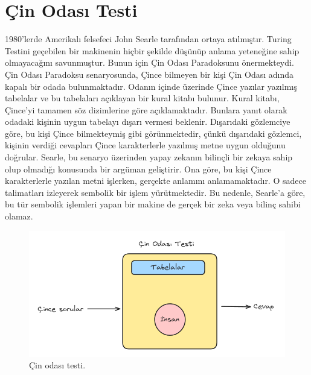 \section{Çin Odası Testi}
1980'lerde Amerikalı felsefeci John Searle tarafından ortaya atılmıştır. Turing Testini geçebilen bir makinenin hiçbir şekilde düşünüp anlama yeteneğine sahip olmayacağını savunmuştur. Bunun için Çin Odası Paradoksunu önermekteydi. Çin Odası Paradoksu senaryosunda, Çince bilmeyen bir kişi Çin Odası adında kapalı bir odada bulunmaktadır. Odanın içinde üzerinde Çince yazılar yazılmış tabelalar ve bu tabelaları açıklayan bir kural kitabı bulunur. Kural kitabı, Çince'yi tamamen söz dizimlerine göre açıklamaktadır. Bunlara yanıt olarak odadaki kişinin uygun tabelayı dışarı vermesi beklenir.  Dışarıdaki gözlemciye göre, bu kişi Çince bilmekteymiş gibi görünmektedir, çünkü dışarıdaki gözlemci, kişinin verdiği cevapları Çince karakterlerle yazılmış metne uygun olduğunu doğrular. Searle, bu senaryo üzerinden yapay zekanın bilinçli bir zekaya sahip olup olmadığı konusunda bir argüman geliştirir. Ona göre, bu kişi Çince karakterlerle yazılan metni işlerken, gerçekte anlamını anlamamaktadır. O sadece talimatları izleyerek sembolik bir işlem yürütmektedir. Bu nedenle, Searle'a göre, bu tür sembolik işlemleri yapan bir makine de gerçek bir zeka veya bilinç sahibi olamaz.

\begin{figure}[h]
    \centering
    \includegraphics[width=1\textwidth]{images/chinese_room_test.png}
    \caption{Çin odası testi.}
    \label{fig:enter-label}
\end{figure}

\newpage

